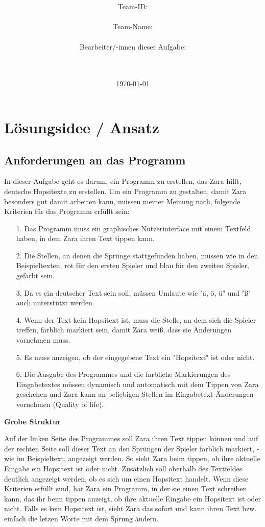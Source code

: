 \documentclass[a4paper,10pt,ngerman]{scrartcl}
\title{\textbf{\Huge\Aufgabe}}
\author{\LARGE Team-ID: \LARGE \TeamId \\\\
	    \LARGE Team-Name: \LARGE \TeamName \\\\
	    \LARGE Bearbeiter/-innen dieser Aufgabe: \\ 
	    \LARGE \Namen\\\\}
\date{\LARGE\today}
\begin{document}
\maketitle
\tableofcontents

\vspace{0.5cm}

\section{Lösungsidee / Ansatz}
\subsection{Anforderungen an das Programm}
In dieser Aufgabe geht es darum, ein Programm zu erstellen, das Zara hilft, deutsche Hopsitexte zu erstellen. 
Um ein Programm zu gestalten, damit Zara besonders gut damit arbeiten kann, müssen meiner Meinung nach, folgende Kriterien für das Programm erfüllt sein: 
\begin{itemize}
    \item[1.]Das Programm muss ein graphisches Nutzerinterface mit einem Textfeld haben, in dem Zara ihren Text tippen kann.
    \item[2.]Die Stellen, an denen die Sprünge stattgefunden haben, müssen wie in den Beispieltexten, rot für den ersten Spieler und blau für den zweiten Spieler, gefärbt sein.
    \item[3.]Da es ein deutscher Text sein soll, müssen Umlaute wie "ä, ö, ü" und "ß" auch unterstützt werden.
    \item[4.]Wenn der Text kein Hopsitext ist, muss die Stelle, an dem sich die Spieler treffen, farblich markiert sein, damit Zara weiß, dass sie Änderungen vornehmen muss.
    \item[5.]Es muss anzeigen, ob der eingegebene Text ein "Hopsitext" ist oder nicht.
    \item[6.]Die Ausgabe des Programmes und die farbliche Markierungen des Eingabetextes müssen dynamisch und automatisch mit dem Tippen von Zara geschehen und Zara kann an beliebigen Stellen im Eingabetext Änderungen vornehmen (Quality of life).
\end{itemize}
\textbf{Grobe Struktur}
\newline

Auf der linken Seite des Programmes soll Zara ihren Text tippen können und auf der rechten Seite soll dieser Text an den Sprüngen der Spieler farblich markiert, - wie im Beispieltext, angezeigt werden.
So sieht Zara beim tippen, ob ihre aktuelle Eingabe ein Hopsitext ist oder nicht. Zusätzlich soll oberhalb des Textfeldes deutlich angezeigt werden, ob es sich um einen Hopsitext handelt.
Wenn diese Kriterien erfüllt sind, hat Zara ein Programm, in der sie einen Text schreiben kann, das ihr beim tippen anzeigt, ob ihre aktuelle Eingabe ein Hopsitext ist oder nicht. Falls es kein Hopsitext ist, sieht Zara das sofort und kann ihren Text bzw. einfach die letzen Worte mit dem Sprung ändern.
\end{document}
